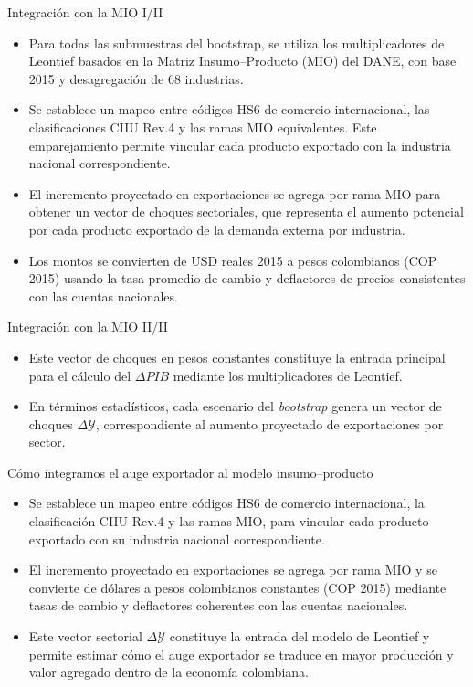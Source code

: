 \documentclass[aspectratio=169,xcolor=dvipsnames]{beamer}
\begin{document}
\begin{frame}{Integración con la MIO I/II}
    \begin{itemize}
        \item Para todas las submuestras del bootstrap, se utiliza los multiplicadores de Leontief basados en la Matriz Insumo–Producto (MIO) del DANE, con base 2015 y desagregación de 68 industrias.
        \item Se establece un mapeo entre códigos HS6 de comercio internacional, las clasificaciones CIIU Rev.4 y las ramas MIO equivalentes. Este emparejamiento permite vincular cada producto exportado con la industria nacional correspondiente.
        \item El incremento proyectado en exportaciones se agrega por rama MIO para obtener un vector de choques sectoriales, que representa el aumento potencial por cada producto exportado de la demanda externa por industria.
        \item Los montos se convierten de USD reales 2015 a pesos colombianos (COP 2015) usando la tasa promedio de cambio y deflactores de precios consistentes con las cuentas nacionales.
    \end{itemize}
\end{frame}

\begin{frame}{Integración con la MIO II/II}
    \begin{itemize}
        \item Este vector de choques en pesos constantes constituye la entrada principal para el cálculo del \(\Delta PIB\) mediante los multiplicadores de Leontief.
        \item En términos estadísticos, cada escenario del \textit{bootstrap} genera un vector de choques $\Delta \mathcal{Y}$, correspondiente al aumento proyectado de exportaciones por sector.
    \end{itemize}
\end{frame}

\begin{frame}{Cómo integramos el auge exportador al modelo insumo–producto}
    \begin{itemize}
        \item Se establece un mapeo entre códigos HS6 de comercio internacional, la clasificación CIIU Rev.4 y las ramas MIO, para vincular cada producto exportado con su industria nacional correspondiente.
        \item El incremento proyectado en exportaciones se agrega por rama MIO y se convierte de dólares a pesos colombianos constantes (COP 2015) mediante tasas de cambio y deflactores coherentes con las cuentas nacionales.
        \item Este vector sectorial $\Delta \mathcal{Y}$ constituye la entrada del modelo de Leontief y permite estimar cómo el auge exportador se traduce en mayor producción y valor agregado dentro de la economía colombiana.
    \end{itemize}
\end{frame}
\end{document}
